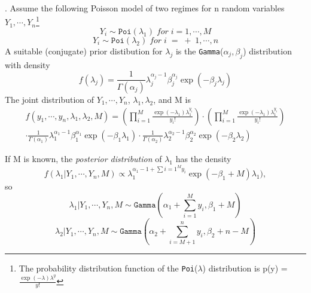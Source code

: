 \documentclass[3pd]{elsarticle}
\newenvironment{example}[1][Example]{\begin{trivlist}
\item[\hskip \labelsep {\bfseries #1}]}{\end{trivlist}}
\begin{document}
\begin{example}[Poisson change point model]. Assume the following Poisson model of two regimes for n random
variables $Y_1,\cdots,Y_n$\footnote{The probability distribution function of the \texttt{Poi}($\lambda$) distribution
is p(y) = $\frac{\exp(-\lambda)\lambda^{y}}{y!}$}
 \begin{equation*}
  Y_i \sim \mathtt{Poi}(\lambda_1)\;for\;i=1,\cdots,M
 \end{equation*}
\begin{equation*}
 Y_i \sim \mathtt{Poi}(\lambda_2)\;for\; i\;=\;+\;1,\cdots,n
\end{equation*}
A suitable (conjugate) prior distibution for $\lambda_j$ is the \texttt{Gamma}($\alpha_j,\beta_j$) distribution with
density 
\begin{equation*}
f(\lambda_j) = \frac{1}{\Gamma(\alpha_j)}\lambda_{j}^{\alpha_{j} - 1}\beta_{j}^{\alpha_{j}}\exp(-\beta_{j}\lambda_{j})
\end{equation*}
The joint distribution of $Y_1,\cdots,Y_n$, $\lambda_1,\lambda_2$, and M is 
\begin{eqnarray*}
 f(y_1,\cdots,y_n,\lambda_1,\lambda_2,M) = \left( \prod_{i=1}^{M} \frac{\exp(-\lambda_1)\lambda_{1}^{y_{i}}}{y_{i} !}\right) \cdot \left(\prod_{i=1}^{M} \frac{\exp(-\lambda_1)\lambda_{1}^{y_{i}}}{y_{i} !} \right)
\\ \cdot \frac{1}{\Gamma(\alpha_1)}\lambda_{1}^{\alpha_1 - 1}\beta_{1}^{\alpha_{1}}\exp(-\beta_{1}\lambda_{1}) 
\cdot \frac{1}{\Gamma(\alpha_{2})}\lambda_{2}^{\alpha_{2} - 1}\beta_{2}^{\alpha_{2}}\exp(-\beta_2 \lambda_2)
 \end{eqnarray*}


\end{example}
If M is known, the \textit{posterior distribution} of $\lambda_{1}$ has the density 
\begin{equation*}
 f(\lambda_{1} | Y_{1}, \cdots, Y_n,M) \varpropto \lambda_{1}^{\alpha_{1} - 1 + \sum{i=1}^{M} y_{i}} \exp(-\beta_{1} + M) \lambda_{1}),
\end{equation*}
so 
   \begin{equation}\label{4.1}
    \lambda_{1}| Y_{1},\cdots,Y_{n},M \sim \mathtt{Gamma}\left( \alpha_1 + \sum_{i=1}^{M} y_{i}, \beta_{1} + M \right)
   \end{equation}
\begin{equation}\label{4.2}
 \lambda_{2}|Y_1,\cdots,Y_n,M \sim \mathtt{Gamma}\left(\alpha_2 + \sum_{i=M+1}^{n} y_i, \beta_2 + n - M \right)
\end{equation}
\end{document}
